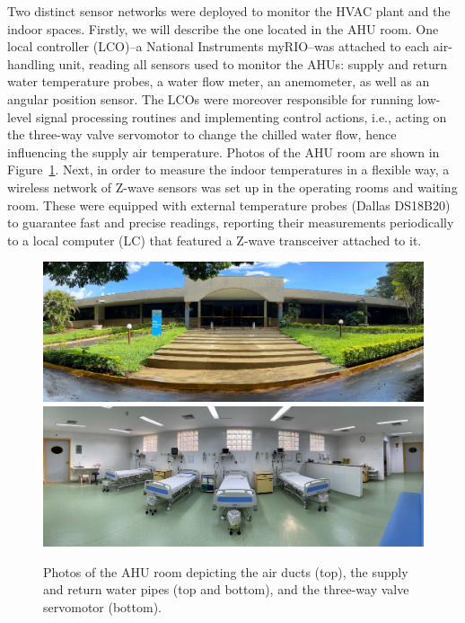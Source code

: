 Two distinct sensor networks were deployed to monitor the HVAC plant and the indoor spaces. Firstly, we will describe the one located in the AHU room. One local controller (LCO)--a National Instruments myRIO--was attached to each air-handling unit, reading all sensors used to monitor the AHUs: supply and return water temperature probes, a water flow meter, an anemometer, as well as an angular position sensor. The LCOs were moreover responsible for running low-level signal processing routines and implementing control actions, i.e., acting on the three-way valve servomotor to change the chilled water flow, hence influencing the supply air temperature. Photos of the AHU room are shown in Figure~\ref{fig.ahuRoom}. Next, in order to measure the indoor temperatures in a flexible way, a wireless network of Z-wave sensors was set up in the operating rooms and waiting room. These were equipped with external temperature probes (Dallas DS18B20) to guarantee fast and precise readings, reporting their measurements periodically to a local computer (LC) that featured a Z-wave transceiver attached to it.


\begin{figure}[!t]
	\centering
	\includegraphics[width=0.9\linewidth]{../images/chap3_facade.jpg} \\[8pt]
	\includegraphics[width=0.9\linewidth]{../images/chap3_rooms.jpg} 
	\caption{Photos of the AHU room depicting the air ducts (top), the supply and return water pipes (top and bottom), and the three-way valve servomotor (bottom).}
	\label{fig.ahuRoom}
\end{figure}

